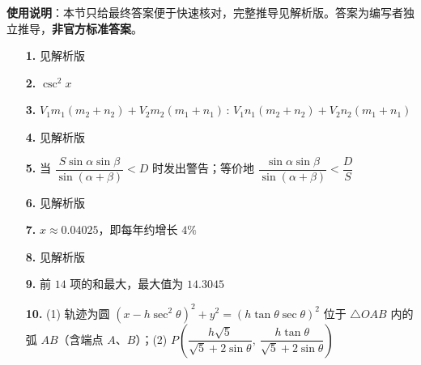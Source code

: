 
\begin{gknotice}
\textbf{使用说明}：本节只给最终答案便于快速核对，完整推导见解析版。答案为编写者独立推导，\textbf{非官方标准答案}。
\end{gknotice}

\begin{itemize}[leftmargin=2.6em]
  \item[\textbf{1.}] 见解析版
  \item[\textbf{2.}] $\csc^2x$
  \item[\textbf{3.}] $V_1m_1(m_2+n_2)+V_2m_2(m_1+n_1)\,:\,V_1n_1(m_2+n_2)+V_2n_2(m_1+n_1)$
  \item[\textbf{4.}] 见解析版
  \item[\textbf{5.}] 当 $\dfrac{S\sin\alpha\sin\beta}{\sin(\alpha+\beta)}<D$ 时发出警告；等价地 $\dfrac{\sin\alpha\sin\beta}{\sin(\alpha+\beta)}<\dfrac DS$
  \item[\textbf{6.}] 见解析版
  \item[\textbf{7.}] $x\approx0.04025$，即每年约增长 $4\%$
  \item[\textbf{8.}] 见解析版
  \item[\textbf{9.}] 前 $14$ 项的和最大，最大值为 $14.3045$
  \item[\textbf{10.}] (1) 轨迹为圆 $\left(x-h\sec^2\theta\right)^2+y^2=\left(h\tan\theta\sec\theta\right)^2$ 位于 $\triangle OAB$ 内的弧 $AB$（含端点 $A$、$B$）；(2) $P\left(\dfrac{h\sqrt5}{\sqrt5+2\sin\theta},\ \dfrac{h\tan\theta}{\sqrt5+2\sin\theta}\right)$
\end{itemize}

